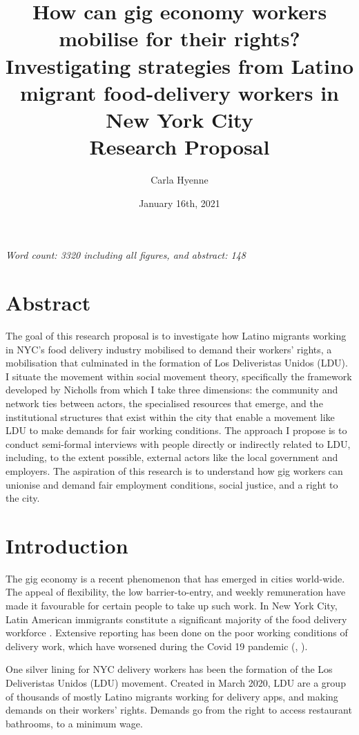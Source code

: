 \documentclass{article}[12pt]
\title{How can gig economy workers mobilise for their rights? Investigating strategies from Latino migrant food-delivery workers in New York City \\[5ex]Research Proposal \\[3ex]}
\author{Carla Hyenne}
\date{January 16th, 2021}
\begin{document}
\maketitle

\textit{Word count: 3320 including all figures, and abstract: 148}

\section{Abstract}

The goal of this research proposal is to investigate how Latino migrants working in NYC’s food delivery industry mobilised to demand their workers’ rights, a mobilisation that culminated in the formation of Los Deliveristas Unidos (LDU).
I situate the movement within social movement theory, specifically the framework developed by Nicholls from which I take three dimensions: the community and network ties between actors, the specialised resources that emerge, and the institutional structures that exist within the city that enable a movement like LDU to make demands for fair working conditions.
The approach I propose is to conduct semi-formal interviews with people directly or indirectly related to LDU, including, to the extent possible, external actors like the local government and employers.
The aspiration of this research is to understand how gig workers can unionise and demand fair employment conditions, social justice, and a right to the city.

\pagebreak


\section{Introduction}

The gig economy is a recent phenomenon that has emerged in cities world-wide. The appeal of flexibility, the low barrier-to-entry, and weekly remuneration have made it favourable for certain people to take up such work. In New York City, Latin American immigrants constitute a significant majority of the food delivery workforce \parencite{ldu_report2021}. Extensive reporting has been done on the poor working conditions of delivery work, which have worsened during the Covid 19 pandemic (\parencite{newyorker2020uncertain}, \parencite{nytimes2021risk}).

One silver lining for NYC delivery workers has been the formation of the Los Deliveristas Unidos (LDU) movement. Created in March 2020, LDU are a group of thousands of mostly Latino migrants working for delivery apps, and making demands on their workers’ rights. Demands go from the right to access restaurant bathrooms, to a minimum wage. 
\end{document}
